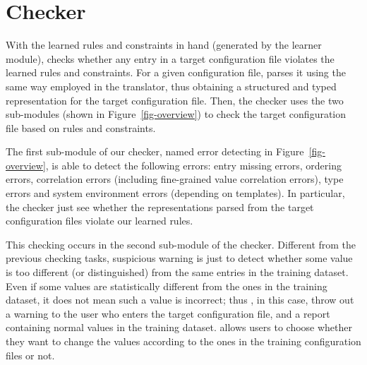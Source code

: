 
\section{Checker}
\label{sec-checker}

With the learned rules and constraints in hand (generated
by the learner module),
\app checks whether any entry in a target configuration file
violates the learned rules and constraints.
For a given configuration file, \app parses it using the same
way employed in the translator, thus obtaining a structured
and typed representation for the target configuration file.
Then, the checker uses the two sub-modules (shown in 
Figure~\ref{fig-overview}) to check the target
configuration file based on rules and constraints.

The first sub-module of our checker,
named error detecting in Figure~\ref{fig-overview}, 
is able to detect the following errors:
entry missing errors, ordering errors, 
correlation errors (including fine-grained value correlation errors),
type errors and system environment errors (depending on templates).
In particular, the checker just see whether the representations 
parsed from the target configuration files violate our
learned rules.

This checking occurs in the second sub-module of the checker.
Different from the previous checking tasks,
suspicious warning is just to detect whether some value
is too different (or distinguished) from the same entries in the
training dataset. Even if some values are statistically different
from the ones in the training dataset, 
it does not mean such a value is incorrect;
thus \app, in this case, throw out a warning to the user who
enters the target configuration file, and a report containing 
normal values in the training dataset.
\app allows users to choose whether they want to change 
the values according to the ones in the training configuration
files or not.
